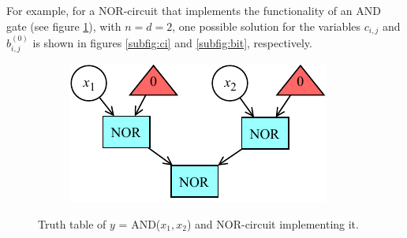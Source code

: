 \documentclass[letterpaper,10pt]{article}
\begin{document}
For example, for a NOR-circuit that implements the functionality of an AND gate (see figure \ref{fig:original}), with $n = d = 2$, one possible solution for the variables $c_{i,j}$ and $b_{i,j}^{(0)}$ is shown in figures \ref{subfig:ci} and \ref{subfig:bit}, respectively.
\begin{figure}[hbtp]
    \centering
    \begin{subfigure}[b]{0.45\textwidth}
    \end{subfigure}\hspace{-0.2\textwidth}
    \begin{subfigure}[b]{0.45\textwidth}
        \includegraphics[width=\textwidth]{circuit.pdf}
    \end{subfigure}
    \caption{Truth table of $y$ = AND($x_1,x_2$) and NOR-circuit implementing it.}
    \label{fig:original}
\end{figure}
\end{document}

